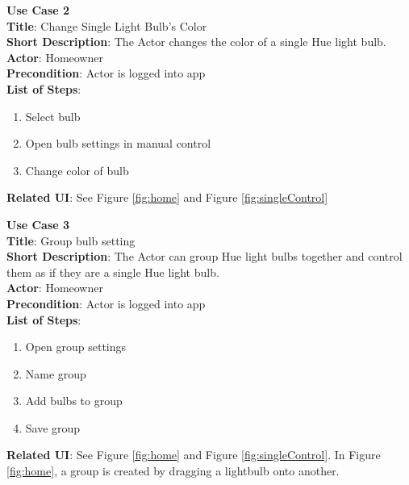 \documentclass[12pt]{article}
\begin{document}
\begin{samepage}
  \begin{framed}
    \textbf{Use Case 2}\\
    \textbf{Title}: Change Single Light Bulb's Color\\
    \textbf{Short Description}: The Actor changes the color of a single Hue light bulb.\\
    \textbf{Actor}: Homeowner \\
    \textbf{Precondition}: Actor is logged into app \\
    \textbf{List of Steps}:
    \begin{enumerate}
      \item Select bulb
      \item Open bulb settings in manual control
      \item Change color of bulb
    \end{enumerate}
    \textbf{Related UI}:  See Figure \ref{fig:home} and Figure \ref{fig:singleControl} 
  \end{framed}
\end{samepage}

\begin{samepage}
  \begin{framed}
    \textbf{Use Case 3} \\
    \textbf{Title}: Group bulb setting \\
    \textbf{Short Description}: The Actor can group Hue light bulbs together and control them as if they are a single Hue light bulb. \\
    \textbf{Actor}: Homeowner \\
    \textbf{Precondition}: Actor is logged into app \\
    \textbf{List of Steps}:
    \begin{enumerate}
      \item Open group settings
      \item Name group
      \item Add bulbs to group
      \item Save group
    \end{enumerate}
    \textbf{Related UI}:  See Figure \ref{fig:home} and Figure \ref{fig:singleControl}. In Figure \ref{fig:home}, a group is created by dragging a lightbulb onto another. 
  \end{framed}
\end{samepage}
\end{document}
